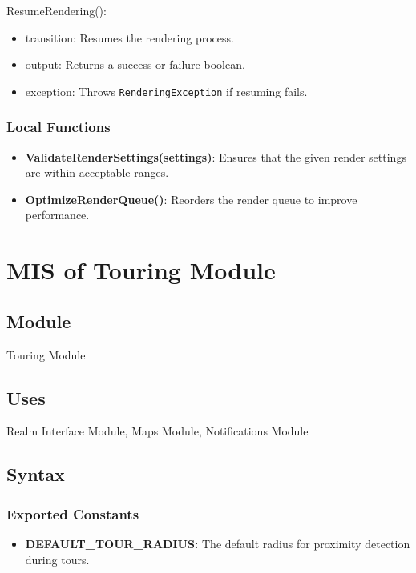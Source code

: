 \documentclass[12pt, titlepage]{article}
\begin{document}
\noindent ResumeRendering():
\begin{itemize}
  \item transition: Resumes the rendering process.
  \item output: Returns a success or failure boolean.
  \item exception: Throws \texttt{RenderingException} if resuming fails.
\end{itemize}

\subsubsection{Local Functions}

\begin{itemize}
  \item \textbf{ValidateRenderSettings(settings)}: Ensures that the given render settings are within acceptable ranges.
  \item \textbf{OptimizeRenderQueue()}: Reorders the render queue to improve performance.
\end{itemize}

\newpage

\section{MIS of Touring Module} \label{TouringModule}

\subsection{Module}

Touring Module

\subsection{Uses}

Realm Interface Module, Maps Module, Notifications Module

\subsection{Syntax}

\subsubsection{Exported Constants}

\begin{itemize}
  \item \textbf{DEFAULT\_TOUR\_RADIUS:} The default radius for proximity detection during tours.
\end{itemize}
\end{document}
